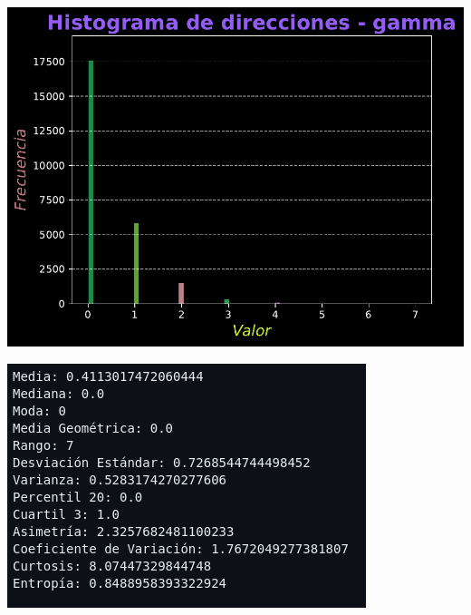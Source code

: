 \documentclass[11pt]{article} %
\begin{document}
	\begin{multicols}{2}
		\begin{minipage}{\linewidth}
			\centering
			\includegraphics[width=1\linewidth]{hist_direcciones_gamma.pdf}
			\label{fig:direcGammaHist}
		\end{minipage}
		\vfill\columnbreak
		\begin{minipage}{\linewidth}
			\centering
			\includegraphics[width=1\linewidth]{g1.png}%
			\label{direcGammaMet}
		\end{minipage}
	\end{multicols}
	
\end{document}

